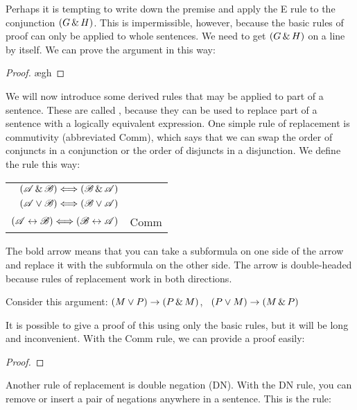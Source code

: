 Perhaps it is tempting to write down the premise and apply the {\eand}E rule to the conjunction $(G \,\&\, H)$. This is impermissible, however, because the basic rules of proof can only be applied to whole sentences. We need to get $(G \,\&\, H)$ on a line by itself. We can prove the argument in this way:

\begin{proof}
	\open
		\ae{gh}
	\close
\end{proof}

We will now introduce some derived rules that may be applied to part of a sentence. These are called , because they can be used to replace part of a sentence with a logically equivalent expression. One simple rule of replacement is commutivity (abbreviated Comm), which says that we can swap the order of conjuncts in a conjunction or the order of disjuncts in a disjunction. We define the rule this way:

\begin{center}
\begin{tabular}{rl}
$(\mathscr{A}\,\&\,\mathscr{B}) \Longleftrightarrow (\mathscr{B}\,\&\,\mathscr{A})$\\
$(\mathscr{A}\vee\mathscr{B}) \Longleftrightarrow (\mathscr{B}\vee\mathscr{A})$\\
$(\mathscr{A}\leftrightarrow\mathscr{B}) \Longleftrightarrow (\mathscr{B}\leftrightarrow\mathscr{A})$
& Comm
\end{tabular}
\end{center}

The bold arrow means that you can take a subformula on one side of the arrow and replace it with the subformula on the other side. The arrow is double-headed because rules of replacement work in both directions.

Consider this argument: $(M \vee P) \rightarrow (P \,\&\, M)$, \therefore\ $(P \vee M) \rightarrow (M \,\&\, P)$

It is possible to give a proof of this using only the basic rules, but it will be long and inconvenient. With the Comm rule, we can provide a proof easily:

\begin{proof}
\end{proof}

Another rule of replacement is double negation (DN). With the DN rule, you can remove or insert a pair of negations anywhere in a sentence. This is the rule:

